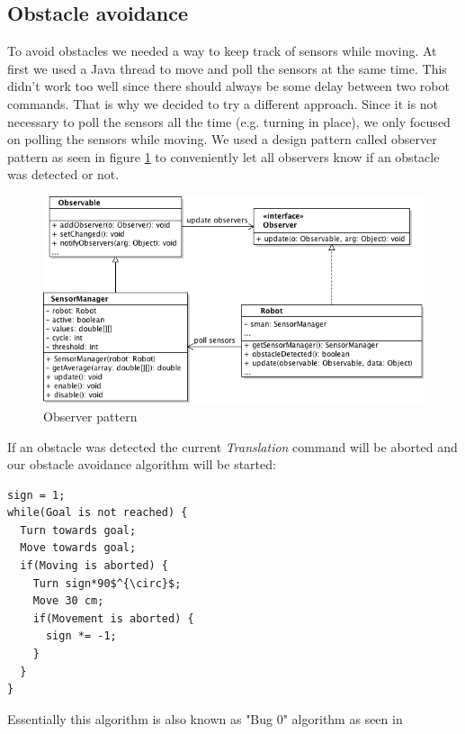 \documentclass[703030]{./includes/iisreport}
\begin{document}
\subsection{Obstacle avoidance} \label{obstacle_avoidance}
To avoid obstacles we needed a way to keep track of sensors while moving. At
first we used a Java thread to move and poll the sensors at the same time. This
didn't work too well since there should always be some delay between two robot
commands. That is why we decided to try a different approach. Since it is not
necessary to poll the sensors all the time (e.g. turning in place), we only
focused on polling the sensors while moving. We used a design pattern called
observer pattern as seen in figure \ref{img:observerpattern} to conveniently let
all observers know if an obstacle was detected or not.

\begin{figure}
	\centering
	\includegraphics[width=\textwidth,height=\textheight,keepaspectratio]{./graphics/observerpattern.png}
	\caption{Observer pattern}
	\label{img:observerpattern}
\end{figure}

\noindent If an obstacle was detected the current \emph{Translation} command 
will be aborted and our obstacle avoidance algorithm will be started:

\begin{lstlisting}[mathescape]
sign = 1;
while(Goal is not reached) {
  Turn towards goal;
  Move towards goal;
  if(Moving is aborted) {
    Turn sign*90$^{\circ}$;
    Move 30 cm;
    if(Movement is aborted) {
      sign *= -1;
    }
  }
}
\end{lstlisting}

\noindent Essentially this algorithm is also known as "Bug 0" algorithm as seen in \citep[7]{bug-algorithms}
\end{document}
